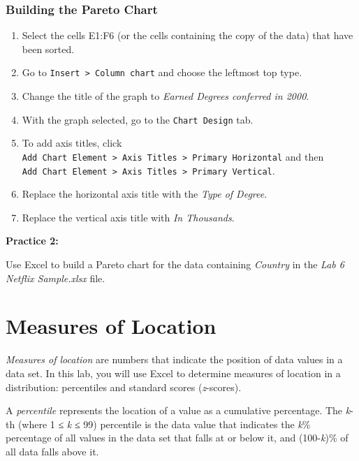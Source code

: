 \documentclass[
]{book}
\providecommand{\tightlist}{%
  \setlength{\itemsep}{0pt}\setlength{\parskip}{0pt}}
\begin{document}
\hypertarget{building-the-pareto-chart}{%
\subsection{Building the Pareto Chart}\label{building-the-pareto-chart}}

\begin{enumerate}
\def\labelenumi{\arabic{enumi}.}
\tightlist
\item
  Select the cells E1:F6 (or the cells containing the copy of the data) that have been sorted.
\item
  Go to \texttt{Insert\ \textgreater{}\ Column\ chart} and choose the leftmost top type.
\item
  Change the title of the graph to \emph{Earned Degrees conferred in 2000}.
\item
  With the graph selected, go to the \texttt{Chart\ Design} tab.
\item
  To add axis titles, click \texttt{Add\ Chart\ Element\ \textgreater{}\ Axis\ Titles\ \textgreater{}\ Primary\ Horizontal} and then \texttt{Add\ Chart\ Element\ \textgreater{}\ Axis\ Titles\ \textgreater{}\ Primary\ Vertical}.
\item
  Replace the horizontal axis title with the \emph{Type of Degree}.
\item
  Replace the vertical axis title with \emph{In Thousands}.
\end{enumerate}

\textbf{Practice 2:}

Use Excel to build a Pareto chart for the data containing \emph{Country} in the \emph{Lab 6 Netflix Sample.xlsx} file.

\hypertarget{measures-of-location}{%
\chapter{Measures of Location}\label{measures-of-location}}

\emph{Measures of location} are numbers that indicate the position of data values in a data set. In this lab, you will use Excel to determine measures of location in a distribution: percentiles and standard scores (\emph{z}-scores).

A \emph{percentile} represents the location of a value as a cumulative percentage. The \emph{k}-th (where 1 ≤ \emph{k} ≤ 99) percentile is the data value that indicates the \emph{k}\% percentage of all values in the data set that falls at or below it, and (100-\emph{k})\% of all data falls above it.
\end{document}
